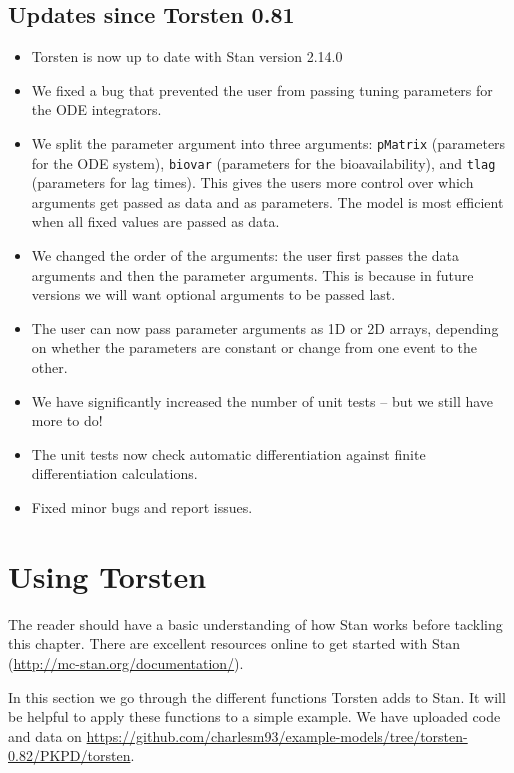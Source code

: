 \documentclass[11pt]{amsart}
\let\oldsection\section
\renewcommand\section{\clearpage\oldsection}
\begin{document}
\subsection{Updates since Torsten 0.81}
\begin{itemize}
  \item Torsten is now up to date with Stan version 2.14.0
  \item We fixed a bug that prevented the user from passing tuning parameters for the ODE integrators.
  \item We split the parameter argument into three arguments: \texttt{pMatrix} (parameters for the ODE system), \texttt{biovar} (parameters for the bioavailability), and \texttt{tlag} (parameters for lag times). This gives the users more control over which arguments get passed as data and as parameters. The model is most efficient when all fixed values are passed as data.
  \item We changed the order of the arguments: the user first passes the data arguments and then the parameter arguments. This is because in future versions we will want optional arguments to be passed last.
  \item The user can now pass parameter arguments as 1D or 2D arrays, depending on whether the parameters are constant or change from one event to the other.
  \item We have significantly increased the number of unit tests -- but we still have more to do!
  \item The unit tests now check automatic differentiation against finite differentiation calculations.
  \item Fixed minor bugs and report issues.
\end{itemize}
 


\section{Using Torsten}

The reader should have a basic understanding of how Stan works before tackling this chapter. There are excellent resources online to get started with Stan (\url{http://mc-stan.org/documentation/}). 

In this section we go through the different functions Torsten adds to Stan. It will be helpful to apply these functions to a simple example. We have uploaded code and data on \url{https://github.com/charlesm93/example-models/tree/torsten-0.82/PKPD/torsten}.
\end{document}
